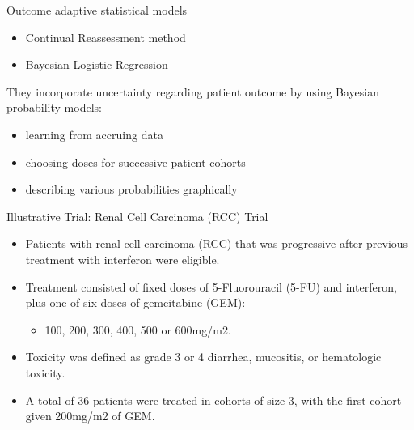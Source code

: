 \documentclass{beamer}
\begin{document}
\begin{frame}{Outcome adaptive statistical models}

\begin{itemize}
\itemsep1pt\parskip0pt
\item
  Continual Reassessment method
\item
  Bayesian Logistic Regression
\end{itemize}

They incorporate uncertainty regarding patient outcome by using Bayesian
probability models:

\begin{itemize}
\itemsep1pt\parskip0pt
\item
  learning from accruing data
\item
  choosing doses for successive patient cohorts
\item
  describing various probabilities graphically
\end{itemize}

\end{frame}

\begin{frame}{Illustrative Trial: Renal Cell Carcinoma (RCC) Trial}

\begin{itemize}
\item
  Patients with renal cell carcinoma (RCC) that was progressive after
  previous treatment with interferon were eligible.
\item
  Treatment consisted of fixed doses of 5-Fluorouracil (5-FU) and
  interferon, plus one of six doses of gemcitabine (GEM):

  \begin{itemize}
  \itemsep1pt\parskip0pt
  \item
    100, 200, 300, 400, 500 or 600mg/m2.
  \end{itemize}
\item
  Toxicity was defined as grade 3 or 4 diarrhea, mucositis, or
  hematologic toxicity.
\item
  A total of 36 patients were treated in cohorts of size 3, with the
  first cohort given 200mg/m2 of GEM.
\end{itemize}

\end{frame}
\end{document}
